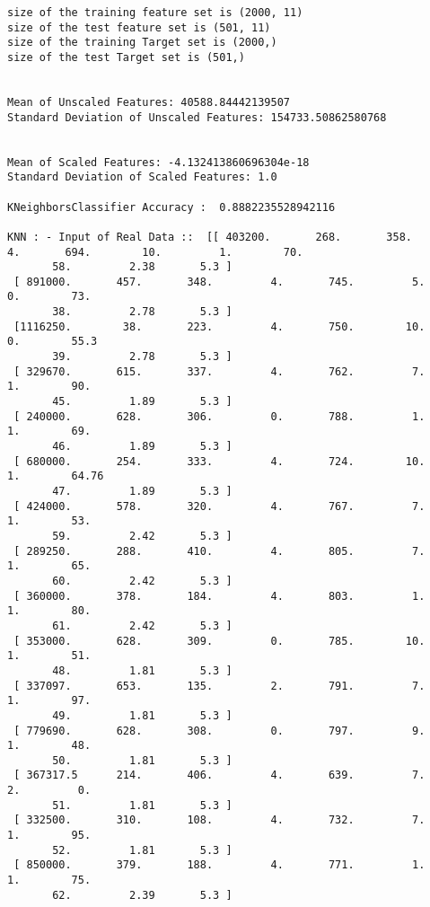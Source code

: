 \documentclass[11pt]{article}
\begin{document}
    \begin{Verbatim}[commandchars=\\\{\}]
size of the training feature set is (2000, 11)
size of the test feature set is (501, 11)
size of the training Target set is (2000,)
size of the test Target set is (501,)


Mean of Unscaled Features: 40588.84442139507
Standard Deviation of Unscaled Features: 154733.50862580768


Mean of Scaled Features: -4.132413860696304e-18
Standard Deviation of Scaled Features: 1.0

KNeighborsClassifier Accuracy :  0.8882235528942116

KNN : - Input of Real Data ::  [[ 403200.       268.       358.         4.       694.        10.         1.        70.
       58.         2.38       5.3 ]
 [ 891000.       457.       348.         4.       745.         5.         0.        73.
       38.         2.78       5.3 ]
 [1116250.        38.       223.         4.       750.        10.         0.        55.3
       39.         2.78       5.3 ]
 [ 329670.       615.       337.         4.       762.         7.         1.        90.
       45.         1.89       5.3 ]
 [ 240000.       628.       306.         0.       788.         1.         1.        69.
       46.         1.89       5.3 ]
 [ 680000.       254.       333.         4.       724.        10.         1.        64.76
       47.         1.89       5.3 ]
 [ 424000.       578.       320.         4.       767.         7.         1.        53.
       59.         2.42       5.3 ]
 [ 289250.       288.       410.         4.       805.         7.         1.        65.
       60.         2.42       5.3 ]
 [ 360000.       378.       184.         4.       803.         1.         1.        80.
       61.         2.42       5.3 ]
 [ 353000.       628.       309.         0.       785.        10.         1.        51.
       48.         1.81       5.3 ]
 [ 337097.       653.       135.         2.       791.         7.         1.        97.
       49.         1.81       5.3 ]
 [ 779690.       628.       308.         0.       797.         9.         1.        48.
       50.         1.81       5.3 ]
 [ 367317.5      214.       406.         4.       639.         7.         2.         0.
       51.         1.81       5.3 ]
 [ 332500.       310.       108.         4.       732.         7.         1.        95.
       52.         1.81       5.3 ]
 [ 850000.       379.       188.         4.       771.         1.         1.        75.
       62.         2.39       5.3 ]

\end{Verbatim}
\end{document}
